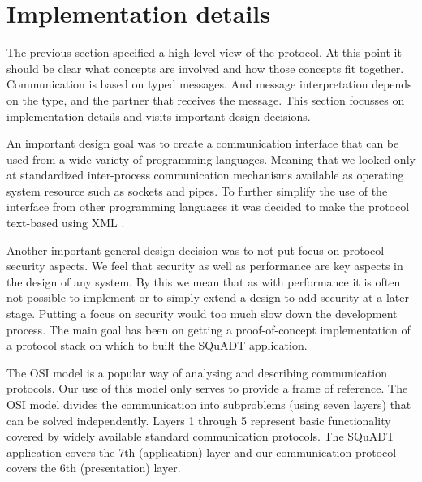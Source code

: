 \documentclass{article}
\newcommand{\squadt}{SQuADT\xspace}
\begin{document}
 \section{Implementation details} \label{s:protocol_implementation}

   The previous section specified a high level view of the protocol. At this
   point it should be clear what concepts are involved and how those concepts
   fit together. Communication is based on typed messages. And message
   interpretation depends on the type, and the partner that receives the
   message. This section focusses on implementation details and visits
   important design decisions.
   
   An important design goal was to create a communication interface that can be
   used from a wide variety of programming languages. Meaning that we looked
   only at standardized inter-process communication mechanisms available as
   operating system resource such as sockets and pipes. To further simplify
   the use of the interface from other programming languages it was decided
   to make the protocol text-based using XML \cite{XML-1_0-4}.

   Another important general design decision was to not put focus on protocol
   security aspects. We feel that security as well as performance are key
   aspects in the design of any system. By this we mean that as with
   performance it is often not possible to implement or to simply extend a
   design to add security at a later stage. Putting a focus on security would
   too much slow down the development process. The main goal has been on
   getting a proof-of-concept implementation of a protocol stack on which to
   built the \squadt application.

   The OSI model \cite{Day1983} is a popular way of analysing and describing
   communication protocols. Our use of this model only serves to provide a
   frame of reference. The OSI model divides the communication into subproblems
   (using seven layers) that can be solved independently. Layers 1 through 5
   represent basic functionality covered by widely available standard
   communication protocols. The \squadt application covers the 7th
   (application) layer and our communication protocol covers the 6th
   (presentation) layer.
   
\end{document}
